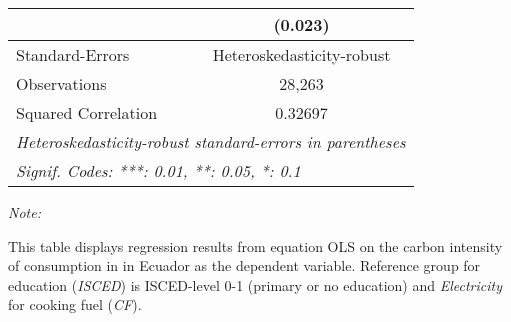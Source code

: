 \begin{table}[htbp!]
\begin{adjustbox}{width = 1\textwidth, max height = 0.95\textheight, center}
\begin{threeparttable}[b]
\begin{tabular}{lc}
                                & (0.023)\\   
            \midrule 
            Standard-Errors     & Heteroskedasticity-robust \\   
            Observations        & 28,263\\  
            Squared Correlation & 0.32697\\  
            \midrule \midrule
            \multicolumn{2}{l}{\emph{Heteroskedasticity-robust standard-errors in parentheses}}\\
            \multicolumn{2}{l}{\emph{Signif. Codes: ***: 0.01, **: 0.05, *: 0.1}}\\
         \end{tabular}
         
         \begin{tablenotes}\item \medskip \textit{Note:}
            \item This table displays regression results from equation OLS on the carbon intensity of consumption in  in Ecuador as the dependent variable. Reference group for education (\textit{ISCED}) is ISCED-level 0-1 (primary or no education) and \textit{Electricity} for cooking fuel (\textit{CF}).
         \end{tablenotes}
      \end{threeparttable}
   \end{adjustbox}
\end{table}


